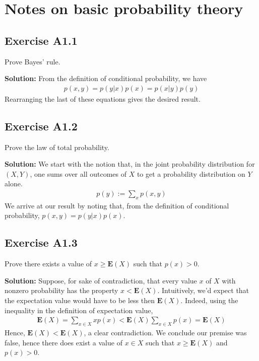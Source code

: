 \documentclass{book}
\begin{document}
\appendix
\renewcommand{\thechapter}{\arabic{chapter}}
\renewcommand{\theequation}{A\thechapter.\arabic{equation}}

\chapter{Notes on basic probability theory}

\section*{Exercise A1.1} 
    Prove Bayes' rule.
    
    \textbf{Solution:} From the definition of conditional probability, we have
    \begin{align}
        p(x,y) = p(y|x)p(x) = p(x|y)p(y)
    \end{align}
    Rearranging the last of these equations gives the desired result.

\section*{Exercise A1.2}
    Prove the law of total probability.
    
    \textbf{Solution:} We start with the notion that, in the joint probability distribution for $(X,Y)$, one sums over all outcomes of $X$ to get a probability distribution on $Y$ alone.
    \begin{align}
        p(y) := \sum_x p(x,y)
    \end{align}
    We arrive at our result by noting that, from the definition of conditional probability, $p(x,y) = p(y|x)p(x)$.

\section*{Exercise A1.3}
    Prove there exists a value of $x\geq\textbf{E}(X)$ such that $p(x)>0$.
    
    \textbf{Solution:} Suppose, for sake of contradiction, that every value $x$ of $X$ with nonzero probability has the property $x < \textbf{E}(X)$. Intuitively, we'd expect that the expectation value would have to be less then $\textbf{E}(X)$. Indeed, using the inequality in the definition of expectation value,
    \begin{align}
        \textbf{E}(X) = \sum_{x\in X} x p(x) < \textbf{E}(X)\sum_{x\in X}p(x) = \textbf{E}(X)
    \end{align}
    Hence, $\textbf{E}(X)<\textbf{E}(X)$, a clear contradiction. We conclude our premise was false, hence there does exist a value of $x\in X$ such that $x \geq \textbf{E}(X)$ and $p(x)>0$.
\end{document}
